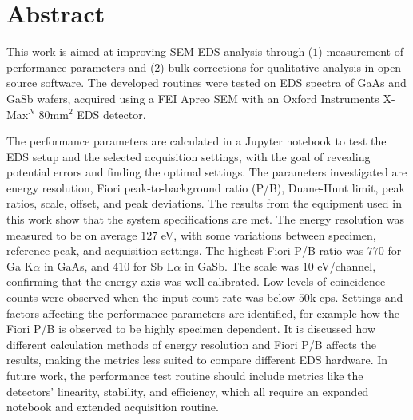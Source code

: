 \chapter*{Abstract}

\label{ch:abstract}

This work is aimed at improving SEM EDS analysis through ($1$) measurement of performance parameters and ($2$) bulk corrections for qualitative analysis in open-source software.
The developed routines were tested on EDS spectra of GaAs and GaSb wafers, acquired using a FEI Apreo SEM with an Oxford Instruments X-Max$^N$ $80$mm$^2$ EDS detector.

The performance parameters are calculated in a Jupyter notebook to test the EDS setup and the selected acquisition settings, with the goal of revealing potential errors and finding the optimal settings.
The parameters investigated are energy resolution, Fiori peak-to-background ratio (P/B), Duane-Hunt limit, peak ratios, scale, offset, and peak deviations.
The results from the equipment used in this work show that the system specifications are met.
The energy resolution was measured to be on average $127$ eV, with some variations between specimen, reference peak, and acquisition settings.
The highest Fiori P/B ratio was $770$ for Ga K$\alpha$ in GaAs, and $410$ for Sb L$\alpha$ in GaSb.
The scale was $10$ eV/channel, confirming that the energy axis was well calibrated.
Low levels of coincidence counts were observed when the input count rate was below $50$k cps.
Settings and factors affecting the performance parameters are identified, for example how the Fiori P/B is observed to be highly specimen dependent.
It is discussed how different calculation methods of energy resolution and Fiori P/B affects the results, making the metrics less suited to compare different EDS hardware.
In future work, the performance test routine should include metrics like the detectors' linearity, stability, and efficiency, which all require an expanded notebook and extended acquisition routine.


